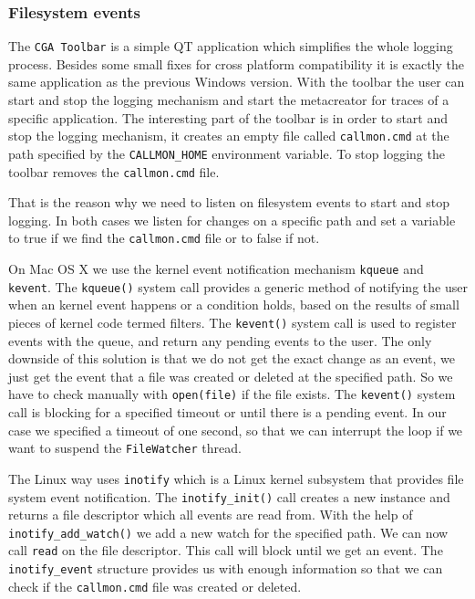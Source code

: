 \subsubsection{Filesystem events}

The \verb=CGA Toolbar= is a simple QT application which simplifies the whole logging process. Besides some small fixes for cross platform compatibility it is exactly the same application as the previous Windows version. With the toolbar the user can start and stop the logging mechanism and start the metacreator for traces of a specific application. The interesting part of the toolbar is in order to start and stop the logging mechanism, it creates an empty file called \verb=callmon.cmd= at the path specified by the \verb=CALLMON_HOME= environment variable. To stop logging the toolbar removes the \verb=callmon.cmd= file.

That is the reason why we need to listen on filesystem events to start and stop logging. In both cases we listen for changes on a specific path and set a variable to true if we find the \verb=callmon.cmd= file or to false if not.

On Mac OS X we use the kernel event notification mechanism \verb=kqueue= and \verb=kevent=. The \verb=kqueue()= system call provides a generic method of notifying the user when an kernel event happens or a condition holds, based on the results of small pieces of kernel code termed filters. The \verb=kevent()= system call is used to register events with the queue, and return any pending events to the user. The only downside of this solution is that we do not get the exact change as an event, we just get the event that a file was created or deleted at the specified path. So we have to check manually with \verb=open(file)= if the file exists. The \verb=kevent()= system call is blocking for a specified timeout or until there is a pending event. In our case we specified a timeout of one second, so that we can interrupt the loop if we want to suspend the \verb=FileWatcher= thread.

The Linux way uses \verb=inotify= which is a Linux kernel subsystem that provides file system event notification. The \verb=inotify_init()= call creates a new instance and returns a file descriptor which all events are read from. With the help of \verb=inotify_add_watch()= we add a new watch for the specified path. We can now call \verb=read= on the file descriptor. This call will block until we get an event. The \verb=inotify_event= structure provides us with enough information so that we can check if the \verb=callmon.cmd= file was created or deleted.

